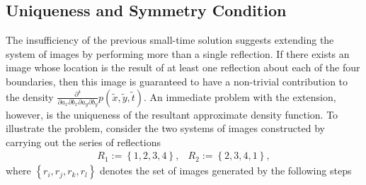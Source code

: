 \subsection{Uniqueness and Symmetry Condition}
The insufficiency of the previous small-time solution suggests
extending the system of images by performing more than a single
reflection. If there exists an image whose location is the
result of at least one reflection about each of the four boundaries,
then this image is guaranteed to have a non-trivial contribution to
the density
$\frac{\partial^4}{\partial a_x \partial b_x \partial a_y \partial
  b_y} p(\tilde{x}, \tilde{y}, \tilde{t})$. An immediate problem with
the extension, however, is the uniqueness of the resultant approximate
density function. To illustrate the problem, consider the two systems
of images constructed by carrying out the series of reflections
\begin{align}
  & R_1 := \left\{ 1,2,3,4 \right\}, & R_2 := \left\{ 2,3,4,1 \right\}, & \label{eq:reflection-sets}
\end{align}
where $\left\{ r_i, r_j, r_k, r_l \right\}$ denotes the set of images
generated by the following steps
